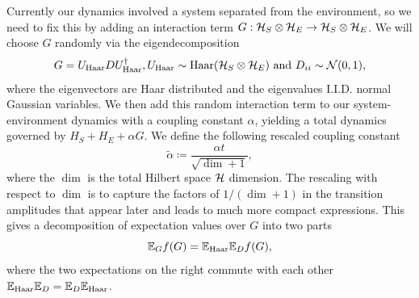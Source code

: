 Currently our dynamics involved a system separated from the environment, so we need to fix this by adding an interaction term $G : \mathcal{H}_S \otimes \mathcal{H}_E \to \mathcal{H}_S \otimes \mathcal{H}_E$. We will choose $G$ randomly via the eigendecomposition 
\begin{equation}
    G = U_{\text{Haar}} D U_{\text{Haar}}^\dagger, U_{\text{Haar}} \sim {\rm Haar}(\mathcal{H}_S \otimes \mathcal{H}_E) \text{ and } D_{ii} \sim \mathcal{N}(0,1), \label{eq:interaction_def}
\end{equation}
where the eigenvectors are Haar distributed and the eigenvalues I.I.D. normal Gaussian variables. We then add this random interaction term to our system-environment dynamics with a coupling constant $\alpha$, yielding a total dynamics governed by $H_S + H_E + \alpha G$. We define the following rescaled coupling constant 
 \begin{equation}
    \widetilde{\alpha} \coloneqq \frac{\alpha t}{\sqrt{\dim + 1}}, \label{eq:a_tilde_def}
\end{equation}
where the $\dim$ is the total Hilbert space $\mathcal{H}$ dimension. The rescaling with respect to $\dim$ is to capture the factors of $1/(\dim + 1)$ in the transition amplitudes that appear later and leads to much more compact expressions.
This gives a decomposition of expectation values over $G$ into two parts 
\begin{equation}
    \mathbb{E}_G f(G) = \mathbb{E}_{\text{Haar}} \mathbb{E}_{D} f(G),
\end{equation}
where the two expectations on the right commute with each other $\mathbb{E}_{\text{Haar}} \mathbb{E}_{D} = \mathbb{E}_{D} \mathbb{E}_{\text{Haar}} $. 

